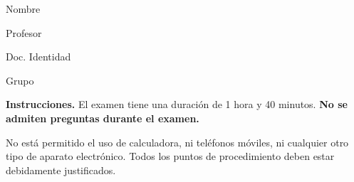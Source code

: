 \documentclass[11pt]{article}
\begin{document}
\examheader

\vspace{4pt}
\noindent
\begin{minipage}[t]{0.62\linewidth}
Nombre \dotfill

\vspace{4pt}
Profesor \dotfill
\end{minipage}%
\hfill
\begin{minipage}[t]{0.32\linewidth}
Doc. Identidad \dotfill

\vspace{4pt}
Grupo \dotfill
\end{minipage}

\vspace{6pt}
\noindent\textbf{Instrucciones.} El examen tiene una duración de 1 hora y 40 minutos. \textbf{No se admiten preguntas durante el examen.}

\noindent No está permitido el uso de calculadora, ni teléfonos móviles, ni cualquier otro tipo de aparato electrónico. Todos los puntos de procedimiento deben estar debidamente justificados.
\end{document}
